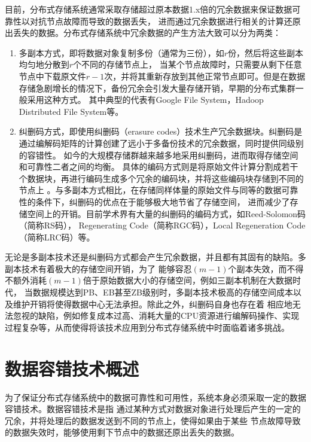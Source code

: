 目前，分布式存储系统通常采取存储超过原本数据1.x倍的冗余数据来保证数据可靠性以对抗节点故障而导致的数据丢失，
进而通过冗余数据进行相关的计算还原出丢失的数据。分布式存储系统中冗余数据的产生方法大致可以分为两类：
\begin{enumerate}
    \item 多副本方式，即将数据对象复制多份（通常为三份），如$r$份，然后将这些副本均匀地分散到$r$个不同的存储节点上，
          当某个节点故障时，只需要从剩下任意节点中下载原文件$r-1$次，并将其重新存放到其他正常节点即可。但是在数据存储急剧增长的情况下，备份冗余会引发大量存储开销，早期的分布式集群一般采用这种方式。
          其中典型的代表有Google File System\cite{ghemawat2003google}，Hadoop Distributed File System\cite{borthakur2008hdfs}等。
    \item 纠删码方式，即使用纠删码（erasure codes）技术生产冗余数据块。纠删码是通过编解码矩阵的计算创建了远小于多备份技术的冗余数据，同时提供同级别的容错性\cite{weatherspoon2002erasure}。
		  如今的大规模存储群越来越多地采用纠删码\citep{ford2010availability,huang2012erasure,muralidhar2014f4,ovsiannikov2013quantcast}，进而取得存储空间和可靠性二者之间的均衡。
          具体的编码方式则是将原始文件计算分割成若干个数据块，再进行编码生成多个冗余的编码块，并将这些编码块存储到不同的节点上
          。与多副本方式相比，在存储同样体量的原始文件与同等的数据可靠性的条件下，纠删码的优点在于能够极大地节省了存储空间，
          进而减少了存储空间上的开销。目前学术界有大量的纠删码的编码方式，如Reed-Solomon码（简称RS码）\cite{reed1960polynomial}，
          Regenerating Code（简称RGC码）\cite{wu2009reducing}，Local Regeneration Code（简称LRC码）\cite{kamath2014codes}等。
\end{enumerate}

无论是多副本技术还是纠删码方式都会产生冗余数据，并且都有其固有的缺陷。多副本技术有着极大的存储空间开销，为了
能够容忍$(m-1)$个副本失效，而不得不额外消耗$(m-1)$倍于原始数据大小的存储空间，例如三副本机制在大数据时代，
当数据规模达到PB、EB甚至ZB级别时，多副本技术极高的存储空间成本以及维护开销将使得数据中心无法承担。除此之外，纠删码自身也存在着
相应地无法忽视的缺陷，例如修复成本过高、消耗大量的CPU资源进行编解码操作、实现过程复杂等，从而使得将该技术应用到分布式存储系统中时面临着诸多挑战。

\section{数据容错技术概述}
为了保证分布式存储系统中的数据可靠性和可用性，系统本身必须采取一定的数据容错技术。数据容错技术是指
通过某种方式对数据对象进行处理后产生的一定的冗余，并将处理后的数据发送到不同的节点上，使得如果由于某些
节点故障导致的数据失效时，能够使用剩下节点中的数据还原出丢失的数据。

